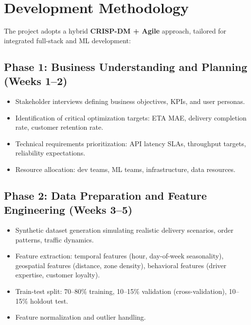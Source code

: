 \documentclass[12pt,a4paper]{report}
\begin{document}
\section{Development Methodology}

The project adopts a hybrid \textbf{CRISP-DM + Agile} approach, tailored for integrated full-stack and ML development:

\subsection{Phase 1: Business Understanding and Planning (Weeks 1--2)}
\begin{itemize}
    \item Stakeholder interviews defining business objectives, KPIs, and user personas.
    \item Identification of critical optimization targets: ETA MAE, delivery completion rate, customer retention rate.
    \item Technical requirements prioritization: API latency SLAs, throughput targets, reliability expectations.
    \item Resource allocation: dev teams, ML teams, infrastructure, data resources.
\end{itemize}

\subsection{Phase 2: Data Preparation and Feature Engineering (Weeks 3--5)}
\begin{itemize}
    \item Synthetic dataset generation simulating realistic delivery scenarios, order patterns, traffic dynamics.
    \item Feature extraction: temporal features (hour, day-of-week seasonality), geospatial features (distance, zone density), behavioral features (driver expertise, customer loyalty).
    \item Train-test split: 70--80\% training, 10--15\% validation (cross-validation), 10--15\% holdout test.
    \item Feature normalization and outlier handling.
\end{itemize}
\end{document}
